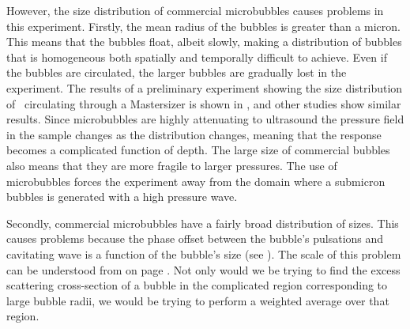 {  However, the size distribution of commercial microbubbles causes problems in this experiment.
  Firstly, the mean radius of the bubbles is greater than a micron.
  This means that the bubbles float, albeit slowly, making a distribution of bubbles
  that is homogeneous both spatially and temporally difficult to achieve.
  Even if the bubbles are circulated, the larger bubbles are gradually lost in the experiment.
  The results of a preliminary experiment showing the size distribution of \Sonovue\ circulating 
   through a Mastersizer is shown in ,
  and other studies show similar results.
  Since microbubbles are highly attenuating to ultrasound 
  the pressure field in the sample changes as the distribution changes,
  meaning that the response becomes a complicated function of depth.
  The large size of commercial bubbles also means that they are more fragile to larger pressures.
  The use of microbubbles forces the experiment away from the domain where a submicron bubbles is generated  with a high pressure wave.
  


  Secondly, commercial microbubbles have a fairly broad distribution of sizes.
  This causes problems because the phase offset between the bubble's pulsations and  cavitating wave 
  is a function of the bubble's size (see ).
  The scale of this problem can be understood from  on page \pageref{fig:phase_radial}.
  Not only would we be trying to find the excess scattering cross-section of  a bubble in the complicated region
  corresponding to large bubble radii, we would be trying to perform a weighted average over that region.





}
